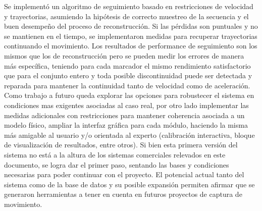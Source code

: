 Se implementó un algoritmo de seguimiento basado en restricciones de velocidad y trayectorias, asumiendo la hipótesis de correcto muestreo de la secuencia y el buen desempeño del proceso de reconstrucción. Si las pérdidas son puntuales y no se mantienen en el tiempo, se implementaron medidas para recuperar trayectorias continuando el movimiento. Los resultados de performance de seguimiento son los mismos que los de reconstrucción pero se pueden medir los errores de manera más específica, teniendo para cada marcador el mismo rendimiento satisfactorio que para el conjunto entero y toda posible discontinuidad puede ser detectada y reparada para mantener la continuidad tanto de velocidad como de aceleración. 
\\ 



 

Como trabajo a futuro queda explorar las opciones para robustecer el sistema en condiciones mas exigentes asociadas al caso real, por otro lado implementar las medidas adicionales con restricciones para mantener coherencia asociada a un modelo físico, ampliar la interfaz gráfica para cada módulo, haciendo la misma más amigable al usuario y/o orientada al experto (calibración interactiva, bloque de visualización de resultados, entre otros).
Si bien esta primera versión del sistema no está a la altura de los sistemas comerciales relevados en este documento, se logra dar el primer paso, sentando las bases y condiciones necesarias para poder continuar con el proyecto.
El potencial actual tanto del sistema como de la base de datos y su posible expansión permiten afirmar que se generaron herramientas a tener en cuenta en futuros proyectos de captura de movimiento.

